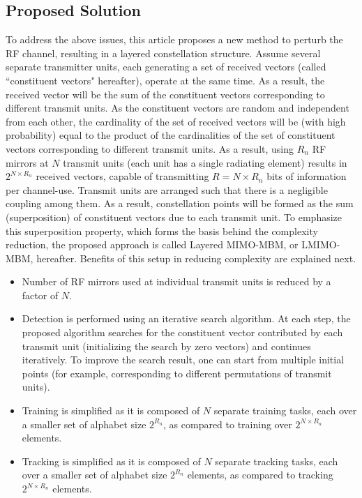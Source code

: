 \subsection{Proposed Solution}
	
To address the above issues, this article proposes a new method to perturb the RF channel, resulting in a layered constellation structure.  Assume several separate transmitter units, each generating a set of received vectors (called ``constituent vectors" hereafter), operate at the same time. As a result, the received vector will be the sum of the constituent vectors corresponding to different transmit units. As the constituent vectors are random and independent from each other, the cardinality of the set of received vectors will be (with high probability) equal to the product of the cardinalities of the set of constituent vectors corresponding to different transmit units.  As a result, using $R_n$ RF mirrors at $N$ transmit units (each unit has a single radiating element) results in $2^ {N \times R_n}$ received vectors, capable of transmitting $R = N \times R_n$ bits of information per channel-use. Transmit units are arranged such that there is a negligible coupling among them. As a result, constellation points will be formed as the sum (superposition) of constituent vectors due to each transmit unit. To emphasize this superposition property, which forms the basis behind the complexity reduction, the proposed approach is called Layered MIMO-MBM, or LMIMO-MBM, hereafter. Benefits of this setup in reducing complexity are explained next.

\begin{itemize}

\item Number of RF mirrors used at individual transmit units is reduced by a factor of $N$.

\item Detection is performed using an iterative search algorithm. At each step, the proposed algorithm searches for the constituent vector contributed by each transmit unit (initializing the search by zero vectors) and continues iteratively. To improve the search result, one can start from multiple initial points (for example, corresponding to different permutations of transmit units).	

\item Training is simplified as it is composed of $N$ separate training tasks, each over a smaller set of alphabet size  $2^{R_n}$, as compared to training over $2 ^ {N \times R_n}$ elements.

\item Tracking is simplified as it is composed of $N$ separate tracking tasks, each over a smaller set of alphabet size $2^{R_n}$ elements, as compared to tracking $2 ^ {N \times R_n}$ elements. 

\end{itemize}

